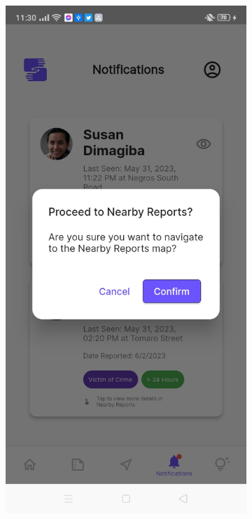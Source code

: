 \begin{figure}[!h]
\begin{subfigure}[c]{0.30\linewidth}
    \end{subfigure}
    \centering
    \begin{subfigure}[c]{0.30\linewidth}
        \centering
        \includegraphics[scale=0.15]{figures/Chapter4/Main/Notifications-2.jpg}

\end{subfigure}
\end{figure}
